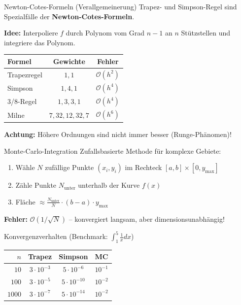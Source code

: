 \documentclass[a4paper,fontsize = 7pt]{scrartcl}
\renewcommand*{\arraystretch}{2}
\begin{document}
\begin{mainbox}{Newton-Cotes-Formeln (Verallgemeinerung)}
Trapez- und Simpson-Regel sind Spezialfälle der \textbf{Newton-Cotes-Formeln}.

\textbf{Idee:} Interpoliere $f$ durch Polynom vom Grad $n-1$ an $n$ Stützstellen und integriere das Polynom.

\renewcommand*{\arraystretch}{1.4}
\begin{center}
\begin{tabular}{l|c|c}
\textbf{Formel} & \textbf{Gewichte} & \textbf{Fehler} \\
\hline
Trapezregel & $1, 1$ & $\mathcal{O}(h^2)$ \\
Simpson & $1, 4, 1$ & $\mathcal{O}(h^4)$ \\
3/8-Regel & $1, 3, 3, 1$ & $\mathcal{O}(h^4)$ \\
Milne & $7, 32, 12, 32, 7$ & $\mathcal{O}(h^6)$ \\
\end{tabular}
\end{center}

\textbf{Achtung:} Höhere Ordnungen sind nicht immer besser (Runge-Phänomen)!
\end{mainbox}

\begin{subbox}{Monte-Carlo-Integration}
Zufallsbasierte Methode für komplexe Gebiete:

\begin{enumerate}
	\item Wähle $N$ zufällige Punkte $(x_i, y_i)$ im Rechteck $[a,b] \times [0, y_{\max}]$
	\item Zähle Punkte $N_{\text{unter}}$ unterhalb der Kurve $f(x)$
	\item Fläche $\approx \frac{N_{\text{unter}}}{N} \cdot (b-a) \cdot y_{\max}$
\end{enumerate}

\textbf{Fehler:} $\mathcal{O}(1/\sqrt{N})$ -- konvergiert langsam, aber dimensionsunabhängig!
\end{subbox}

\begin{subbox}{Konvergenzverhalten (Benchmark: $\int_1^5 \frac{1}{x}dx$)}
\renewcommand*{\arraystretch}{1.3}
\begin{center}
\begin{tabular}{r|c|c|c}
$n$ & Trapez & Simpson & MC \\
\hline
$10$ & $3 \cdot 10^{-3}$ & $5 \cdot 10^{-6}$ & $10^{-1}$ \\
$100$ & $3 \cdot 10^{-5}$ & $5 \cdot 10^{-10}$ & $10^{-2}$ \\
$1000$ & $3 \cdot 10^{-7}$ & $5 \cdot 10^{-14}$ & $10^{-2}$ \\
\end{tabular}
\end{center}
\end{subbox}
\end{document}
